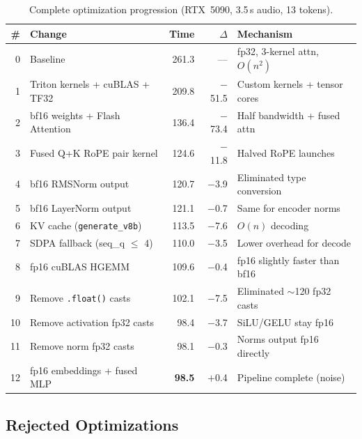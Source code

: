 \documentclass{article}
\begin{document}
\begin{table}[h]
\centering
\caption{Complete optimization progression (RTX~5090, 3.5\,s audio, 13 tokens).}
\label{tab:progression}
\small
\begin{tabular}{@{}rlrrl@{}}
\toprule
\textbf{\#} & \textbf{Change} & \textbf{Time} & \textbf{$\Delta$} & \textbf{Mechanism} \\
\midrule
0 & Baseline & 261.3 & --- & fp32, 3-kernel attn, $O(n^2)$ \\
1 & Triton kernels + cuBLAS + TF32 & 209.8 & $-$51.5 & Custom kernels + tensor cores \\
2 & bf16 weights + Flash Attention & 136.4 & $-$73.4 & Half bandwidth + fused attn \\
3 & Fused Q+K RoPE pair kernel & 124.6 & $-$11.8 & Halved RoPE launches \\
4 & bf16 RMSNorm output & 120.7 & $-$3.9 & Eliminated type conversion \\
5 & bf16 LayerNorm output & 121.1 & $-$0.7 & Same for encoder norms \\
6 & KV cache (\texttt{generate\_v8b}) & 113.5 & $-$7.6 & $O(n) $ decoding \\
7 & SDPA fallback (seq\_q $\leq$ 4) & 110.0 & $-$3.5 & Lower overhead for decode \\
8 & fp16 cuBLAS HGEMM & 109.6 & $-$0.4 & fp16 slightly faster than bf16 \\
9 & Remove \texttt{.float()} casts & 102.1 & $-$7.5 & Eliminated $\sim$120 fp32 casts \\
10 & Remove activation fp32 casts & 98.4 & $-$3.7 & SiLU/GELU stay fp16 \\
11 & Remove norm fp32 casts & 98.1 & $-$0.3 & Norms output fp16 directly \\
12 & fp16 embeddings + fused MLP & \textbf{98.5} & $+$0.4 & Pipeline complete (noise) \\
\bottomrule
\end{tabular}
\end{table}

\subsection{Rejected Optimizations}
\end{document}
